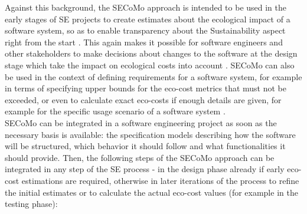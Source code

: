 \documentclass[oribibl]{llncs}
\begin{document}
Against this background, the SECoMo approach is intended to be used in the early stages of SE projects to create estimates about the ecological impact of a software system, so as to enable transparency about the Sustainability aspect right from the start \cite{schulze_cost_2016}. This again makes it possible for software engineers and other stakeholders to make decisions about changes to the software at the design stage which take the impact on ecological costs into account \cite{schulze_cost_2016}. 
SECoMo can also be used in the context of defining requirements for a software system, for example in terms of specifying upper bounds for the eco-cost metrics that must not be exceeded, or even to calculate exact eco-costs if enough details are given, for example for the specific usage scenario of a software system %
\cite{schulze_cost_2016}.\\
SECoMo can be integrated in a software engineering project as soon as the necessary basis is available: the specification models describing how the software will be structured, which behavior it should follow and what functionalities it should provide. %
Then, the following steps of the SECoMo approach can be integrated in any step of the SE process - in the design phase already if early eco-cost estimations are required, otherwise in later iterations of the process to refine the initial estimates or to calculate the actual eco-cost values (for example in the testing phase):\\
\end{document}
